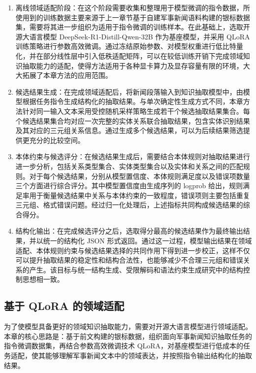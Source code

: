 \begin{enumerate}
\item 离线领域适配阶段：在这个阶段需要收集和整理用于模型微调的指令数据，所使用到的训练数据主要来源于上一章节基于自建军事新闻语料构建的银标数据集，需要将其进一步组织为适用于指令微调的训练样本。在此基础上，选取开源大语言模型 DeepSeek-R1-Distill-Qwen-32B 作为基座模型，并采用 QLoRA 训练策略进行参数高效微调\cite{Guo2025DeepSeekR1,Dettmers2023QLoRA}。通过冻结原始参数、对模型权重进行低比特量化，并在部分线性层中引入低秩适配矩阵，可以在较低训练开销下完成领域知识抽取能力的适配，使得方法适用于各种显卡算力及显存容量有限的环境，大大拓展了本章方法的应用范围。
\item 候选结果生成：在完成领域适配后，将新闻段落输入到知识抽取模型中，由模型根据任务指令生成结构化的抽取结果。与单次确定性生成方式不同，本章方法针对同一输入文本采用受控随机采样策略生成若干个候选抽取结果集合。每个候选结果集合均对应一次完整的实体关系联合抽取结果，包含实体识别结果及其对应的三元组关系信息。通过生成多个候选结果，可以为后续结果筛选提供更充分的比较空间。
\item 本体约束与候选评分：在候选结果生成后，需要结合本体规则对抽取结果进行进一步分析，包括关系类型集合、实体类型集合以及实体和关系之间的匹配规则。对于每个候选结果，分别从模型置信度、本体规则满足度以及错误项数量三个方面进行综合评分。其中模型置信度由生成序列的 logprob 给出，规则满足率用于衡量候选结果中关系与本体约束的一致程度，错误项则主要包括重复三元组、格式错误问题。经过归一化处理后，上述指标共同构成候选结果的综合得分。
\item 结构化输出：在完成候选评分之后，选取得分最高的候选结果作为最终输出结果，并以统一的结构化 JSON 形式返回。通过这一过程，模型输出结果在领域适配、本体规则约束与候选结果选择的共同作用下得到进一步校正，这样不仅可以提升抽取结果的稳定性和结构合法性，也能够减少不合理三元组和错误关系的产生。该目标与统一结构生成、受限解码和语法约束生成研究中的结构控制思想相一致\cite{Lu2022UIE,Hemmer2023LazyKDecoding,Geng2023GrammarConstrainedDecoding}。
\end{enumerate}

\subsection{基于 QLoRA 的领域适配}

为了使模型具备更好的领域知识抽取能力，需要对开源大语言模型进行领域适配。本章的核心思路是：基于前文构建的银标数据，组织面向军事新闻知识抽取任务的指令微调数据集，再结合参数高效微调技术 QLoRA\cite{Dettmers2023QLoRA}，对基座模型进行低成本的任务适配，使其能够理解军事新闻文本中的领域表达，并按照指令输出结构化的抽取结果。

